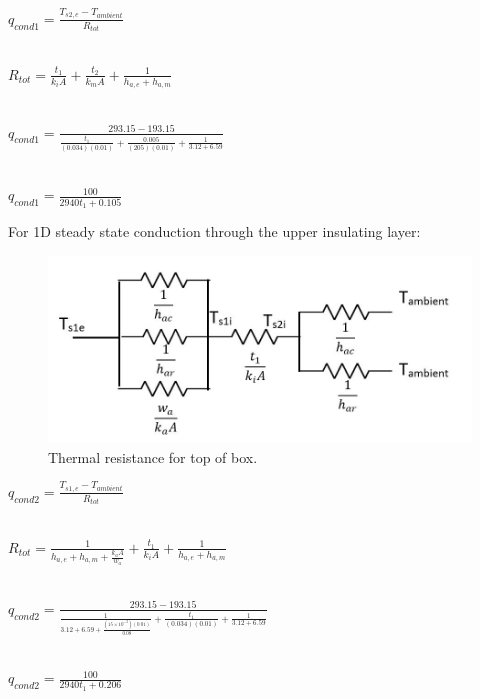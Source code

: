 \begin{center}
 $q_{cond1} = \frac{T_{s2,e}-T_{ambient}}{R_{tot}} $\\
 
 \ 
 
 $R_{tot} = \frac{t_{1}}{k_{i}A} + \frac{t_{2}}{k_{m}A} + \frac{1}{h_{a,e}+h_{a,m}} $\\
 
 \
 \ 
 
 $q_{cond1} = \frac{293.15 - 193.15}{\frac{t_{1}}{(0.034)(0.01)} + \frac{0.005}{(205)(0.01)} + \frac{1}{3.12+6.59}} $\\
 
 \  
 \ 
 
 $q_{cond1} = \frac{100}{2940t_{1}+0.105} $\\
 
\end{center}
 

For 1D steady state conduction through the upper insulating layer: \\

	\begin{figure}[h!]
    \centering
    \includegraphics[scale=0.6]{4-experiment-design/img/mechanical/thermalresistance2.JPG}
	\caption{Thermal resistance for top of box.}
	\label{fig:thermalresistance2}
	\end{figure} 

\begin{center}
 $q_{cond2} = \frac{T_{s1,e}-T_{ambient}}{R_{tot}} $\\
 
 \ 
 
 $R_{tot} = \frac{1}{h_{a,e}+h_{a,m}+\frac{k_{a}A}{w_{a}}} + \frac{t_{1}}{k_{i}A} + \frac{1}{h_{a,e}+h_{a,m}}  $\\
 
 \
 \ 
 
 $q_{cond2} = \frac{293.15 - 193.15}{\frac{1}{3.12+6.59+\frac{(15\times10^{-3})(0.01)}{0.08}} + \frac{t_{1}}{(0.034)(0.01)} + \frac{1}{3.12+6.59}} $\\
 
 \  
 \ 
 
 $q_{cond2} = \frac{100}{2940t_{1}+0.206} $\\
 
\end{center}

